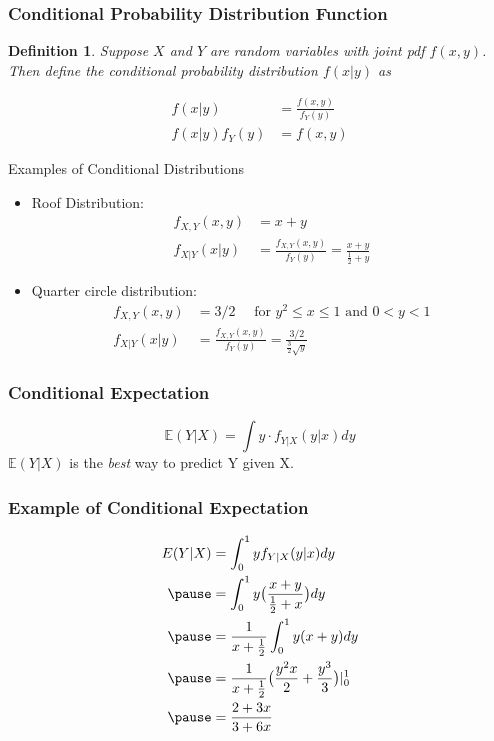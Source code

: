 \documentclass[aspectratio=169, handout]{beamer}
\newtheorem{defn}{Definition}
\numberwithin{equation}{section}
\begin{document}
\begin{frame}
\frametitle{Conditional Probability Distribution Function}
\begin{defn}
Suppose $X$ and $Y$ are random variables with joint pdf $f(x,y)$.  Then define the \alert{conditional probability distribution} $f(x|y)$ as 

\begin{align*}
f(x|y) &= \frac{f(x, y) }{f_{Y}(y) } \\
f(x|y)f_{Y}(y)&= f(x, y)   
\end{align*}

\end{defn}

\end{frame}



\begin{frame}{Examples of Conditional Distributions}
\begin{itemize}
\item Roof Distribution:
\begin{align*}
f_{X,Y}(x,y)&=x+y\\
f_{X|Y}(x|y)&=\frac{f_{X,Y}(x,y)}{f_Y(y)}=\frac{x+y}{\frac{1}{2}+y}
\end{align*}
\item Quarter circle distribution:
\begin{align*}
f_{X,Y}(x,y)&=3/2 \quad \text{ for }y^2\leq x\leq 1 \text{ and }0<y<1\\
f_{X|Y}(x|y)&=\frac{f_{X,Y}(x,y)}{f_Y(y)}=\frac{3/2}{\frac{3}{2}\sqrt{y}}
\end{align*}
\end{itemize}


\end{frame}


\begin{frame}
\frametitle{Conditional Expectation}
$$\mathbb{E}(Y|X)=\int y\cdot f_{Y|X} (y|x)dy $$
$\mathbb{E}(Y|X)$ is the \emph{best} way to predict Y given X.

\end{frame}


\begin{frame}
\frametitle{Example of Conditional Expectation}
\begin{align*}
E(Y|X)&=\int_0^1 y f_{Y|X}(y|x)dy\\ \pause
&=\int_0^1 y \big(\frac{x+y}{\frac{1}{2}+x}\big)dy \\\pause
&=\frac{1}{x+\frac{1}{2}}\int_0^1 y (x+y)dy\\\pause
&=\frac{1}{x+\frac{1}{2}} \big(\frac{y^2x}{2} +\frac{y^3}{3}\big) |_0^1\\\pause
&=\frac{2+3x}{3+6x}
\end{align*}
\end{frame}
\end{document}
